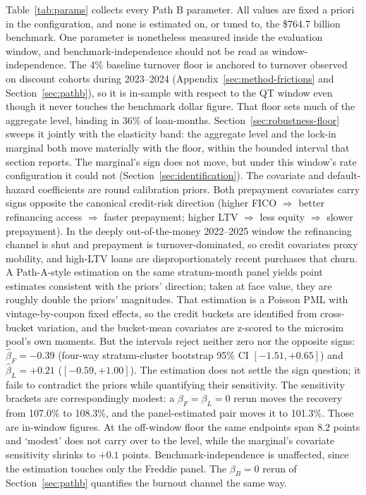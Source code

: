 \documentclass[12pt]{article}
\begin{document}
Table~\ref{tab:params} collects every Path B parameter. All values are fixed a priori in the configuration, and none is estimated on, or tuned to, the \$764.7 billion benchmark. One parameter is nonetheless measured inside the evaluation window, and benchmark-independence should not be read as window-independence. The 4\% baseline turnover floor is anchored to turnover observed on discount cohorts during 2023--2024 (Appendix~\ref{sec:method-frictions} and Section~\ref{sec:pathb}), so it is in-sample with respect to the QT window even though it never touches the benchmark dollar figure. That floor sets much of the aggregate level, binding in 36\% of loan-months. Section~\ref{sec:robustness-floor} sweeps it jointly with the elasticity band: the aggregate level and the lock-in marginal both move materially with the floor, within the bounded interval that section reports. The marginal's sign does not move, but under this window's rate configuration it could not (Section~\ref{sec:identification}). The covariate and default-hazard coefficients are round calibration priors. Both prepayment covariates carry signs opposite the canonical credit-risk direction (higher FICO $\Rightarrow$ better refinancing access $\Rightarrow$ faster prepayment; higher LTV $\Rightarrow$ less equity $\Rightarrow$ slower prepayment). In the deeply out-of-the-money 2022--2025 window the refinancing channel is shut and prepayment is turnover-dominated, so credit covariates proxy mobility, and high-LTV loans are disproportionately recent purchases that churn. A Path-A-style estimation on the same stratum-month panel yields point estimates consistent with the priors' direction; taken at face value, they are roughly double the priors' magnitudes. That estimation is a Poisson PML with vintage-by-coupon fixed effects, so the credit buckets are identified from cross-bucket variation, and the bucket-mean covariates are z-scored to the microsim pool's own moments. But the intervals reject neither zero nor the opposite signs: $\hat{\beta}_F = -0.39$ (four-way stratum-cluster bootstrap 95\% CI $[-1.51, +0.65]$) and $\hat{\beta}_L = +0.21$ ($[-0.59, +1.00]$). The estimation does not settle the sign question; it fails to contradict the priors while quantifying their sensitivity. The sensitivity brackets are correspondingly modest: a $\beta_F = \beta_L = 0$ rerun moves the recovery from 107.0\% to 108.3\%, and the panel-estimated pair moves it to 101.3\%. Those are in-window figures. At the off-window floor the same endpoints span 8.2 points and `modest' does not carry over to the level, while the marginal's covariate sensitivity shrinks to $+0.1$ points. Benchmark-independence is unaffected, since the estimation touches only the Freddie panel. The $\beta_B = 0$ rerun of Section~\ref{sec:pathb} quantifies the burnout channel the same way.
\end{document}
